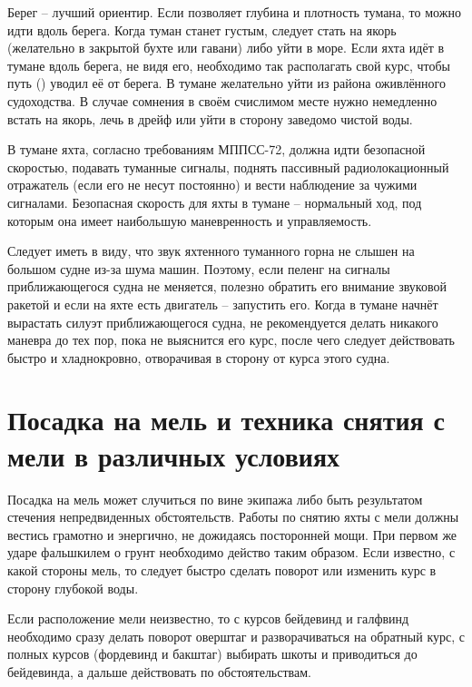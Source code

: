 Берег \--- лучший ориентир. Если позволяет глубина и плотность тумана, то можно идти вдоль берега. Когда туман станет густым, следует стать на якорь (желательно в закрытой бухте или гавани) либо уйти в море. Если яхта идёт в тумане вдоль берега, не видя его, необходимо так располагать свой курс, чтобы путь (\PU) уводил её от берега. В тумане желательно уйти из района оживлённого судоходства. В случае сомнения в своём счислимом месте нужно немедленно встать на якорь, лечь в дрейф или уйти в сторону заведомо чистой воды. 

В тумане яхта, согласно требованиям МППСС-72, должна идти безопасной скоростью, подавать туманные сигналы, поднять пассивный радиолокационный отражатель (если его не несут постоянно) и вести наблюдение за чужими сигналами. Безопасная скорость для яхты в тумане \--- нормальный ход, под которым она имеет наибольшую маневренность и управляемость. 

Следует иметь в виду, что звук яхтенного туманного горна не слышен на большом судне из-за шума машин. Поэтому, если пеленг на сигналы приближающегося судна не меняется, полезно обратить его внимание звуковой ракетой и если на яхте есть двигатель \--- запустить его. Когда в тумане начнёт вырастать силуэт приближающегося судна, не рекомендуется делать никакого маневра до тех пор, пока не выяснится его курс, после чего следует действовать быстро и хладнокровно, отворачивая в сторону от курса этого судна.

\section{Посадка на мель и техника снятия с мели в различных условиях}

Посадка на мель может случиться по вине экипажа либо быть результатом стечения непредвиденных обстоятельств. Работы по снятию яхты с мели должны вестись грамотно и энергично, не дожидаясь посторонней мощи. При первом же ударе фальшкилем о грунт необходимо действо таким образом. Если известно, с какой стороны мель, то следует быстро сделать поворот или изменить курс в сторону глубокой воды.

Если расположение мели неизвестно, то с курсов бейдевинд и галфвинд необходимо сразу делать поворот оверштаг и разворачиваться на обратный курс, с полных курсов (фордевинд и бакштаг) выбирать шкоты и приводиться до бейдевинда, а дальше действовать по обстоятельствам. 

